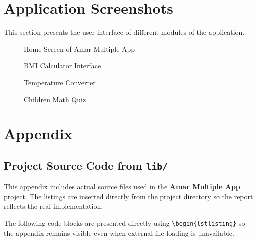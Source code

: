 \documentclass{article}
\begin{document}
\section{Application Screenshots}

This section presents the user interface of different modules of the application.

\begin{figure}[H]
\centering
{}
\caption{Home Screen of Amar Multiple App}
\end{figure}

\begin{figure}[H]
\centering
{}
\caption{BMI Calculator Interface}
\end{figure}

\begin{figure}[H]
\centering
{}
\caption{Temperature Converter}
\end{figure}

\begin{figure}[H]
\centering
{}
\caption{Children Math Quiz}
\end{figure}



\newpage
\section*{Appendix}

\subsection*{Project Source Code from \texttt{lib/}}
This appendix includes actual source files used in the \textbf{Amar Multiple App} project. The listings are inserted directly from the project directory so the report reflects the real implementation.

\begin{insightbox}
The following code blocks are presented directly using \texttt{\textbackslash begin\{lstlisting\}} so the appendix remains visible even when external file loading is unavailable.
\end{insightbox}
\end{document}
